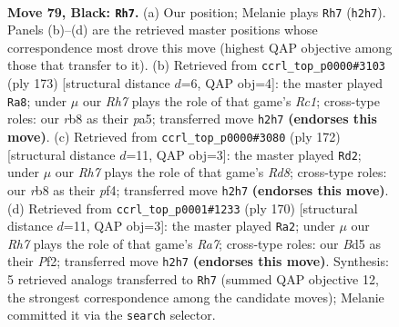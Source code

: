 \documentclass[11pt]{article}
\begin{document}
\clearpage

\begin{figure}[p]\centering
\begin{subfigure}{0.46\textwidth}\centering
\resizebox{\linewidth}{!}{%
\newchessgame
\chessboard[
  setfen={1R6/3k4/8/3b4/1P6/2K5/7r/4R3 b - - 32 79},
  showmover=false,
  pgfstyle=straightmove, color=movearrow, markmove={h2-h7}
]}
\caption{}
\end{subfigure}\hfill
\begin{subfigure}{0.46\textwidth}\centering
\resizebox{\linewidth}{!}{%
\newchessgame
\chessboard[
  setfen={2r5/4b2k/4P3/P2K4/8/8/8/R7 b - - 2 87},
  showmover=false,
  pgfstyle=straightmove, color=movearrow, markmove={c8-a8}
]}
\caption{}
\end{subfigure}
\\[4pt]
\begin{subfigure}{0.46\textwidth}\centering
\resizebox{\linewidth}{!}{%
\newchessgame
\chessboard[
  setfen={3R4/8/4kp2/8/5p2/8/6K1/r7 w - - 2 87},
  showmover=false,
  pgfstyle=straightmove, color=movearrow, markmove={d8-d2}
]}
\caption{}
\end{subfigure}\hfill
\begin{subfigure}{0.46\textwidth}\centering
\resizebox{\linewidth}{!}{%
\newchessgame
\chessboard[
  setfen={8/R7/3k4/4p3/8/1r6/3K1P2/8 w - - 1 86},
  showmover=false,
  pgfstyle=straightmove, color=movearrow, markmove={a7-a2}
]}
\caption{}
\end{subfigure}
\caption{\textbf{Move 79, Black: \texttt{Rh7}.} (a) Our position; Melanie plays \texttt{Rh7} (\texttt{h2h7}). Panels (b)--(d) are the retrieved master positions whose correspondence most drove this move (highest QAP objective among those that transfer to it). (b) Retrieved from \texttt{ccrl\_top\_p0000\#3103} (ply 173) [structural distance $d$=6, QAP obj=4]: the master played \texttt{Ra8}; under $\mu$ our \emph{Rh7} plays the role of that game's \emph{Rc1}; cross-type roles: our \emph{r}b8 as their \emph{p}a5; transferred move \texttt{h2h7} \textbf{(endorses this move)}. (c) Retrieved from \texttt{ccrl\_top\_p0000\#3080} (ply 172) [structural distance $d$=11, QAP obj=3]: the master played \texttt{Rd2}; under $\mu$ our \emph{Rh7} plays the role of that game's \emph{Rd8}; cross-type roles: our \emph{r}b8 as their \emph{p}f4; transferred move \texttt{h2h7} \textbf{(endorses this move)}. (d) Retrieved from \texttt{ccrl\_top\_p0001\#1233} (ply 170) [structural distance $d$=11, QAP obj=3]: the master played \texttt{Ra2}; under $\mu$ our \emph{Rh7} plays the role of that game's \emph{Ra7}; cross-type roles: our \emph{B}d5 as their \emph{P}f2; transferred move \texttt{h2h7} \textbf{(endorses this move)}. Synthesis: 5 retrieved analogs transferred to \texttt{Rh7} (summed QAP objective 12, the strongest correspondence among the candidate moves); Melanie committed it via the \texttt{search} selector.}
\label{fig:thought-m157}
\end{figure}
\end{document}
